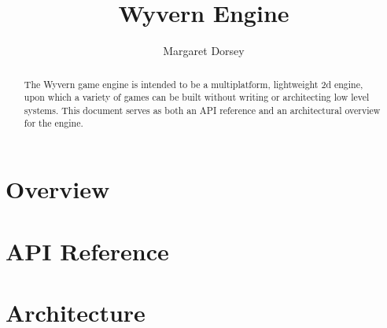 \documentclass[9pt]{memoir} %
\title{Wyvern Engine}
\author{Margaret Dorsey}
\date{} %
\begin{document}

\begin{titlingpage}
\setlength{\droptitle}{30pt} %
\maketitle

\begin{abstract}

\par The Wyvern game engine is intended to be a multiplatform, lightweight 2d engine, upon which a variety of games can
be built without writing or architecting low level systems. This document serves as both an API reference and an architectural 
overview for the engine.
\end{abstract}

\end{titlingpage}


\section{Overview}

\section{API Reference}

\section{Architecture}
\end{document}
